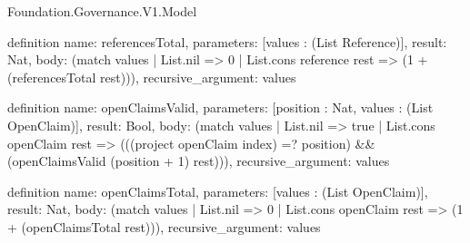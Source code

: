 \begin{lexlean}{Foundation.Governance.V1.Model}
\begin{semanticmodule}
definition{
  name: referencesTotal,
  parameters: [values : (List Reference)],
  result: Nat,
  body: (match values | List.nil => 0 | List.cons reference rest => (1 + (referencesTotal rest))),
  recursive_argument: values
}

definition{
  name: openClaimsValid,
  parameters: [position : Nat, values : (List OpenClaim)],
  result: Bool,
  body: (match values
    | List.nil => true
    | List.cons openClaim rest => (((project openClaim index) =? position) && (openClaimsValid (position + 1) rest))),
  recursive_argument: values
}

definition{
  name: openClaimsTotal,
  parameters: [values : (List OpenClaim)],
  result: Nat,
  body: (match values | List.nil => 0 | List.cons openClaim rest => (1 + (openClaimsTotal rest))),
  recursive_argument: values
}


\end{semanticmodule}
\end{lexlean}
